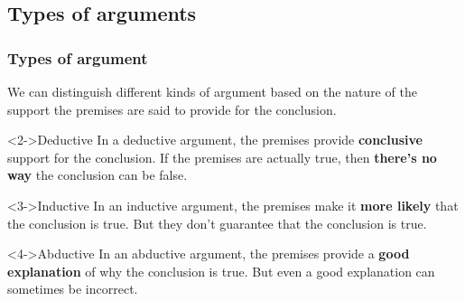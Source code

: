 \documentclass[10pt,letterpaper,xcolor=dvipsnames,handout]{beamer}
\begin{document}
\subsection{Types of arguments}

\begin{frame}
\frametitle{Types of argument}

We can distinguish different kinds of argument based on the nature of the support the premises are said to provide for the conclusion.

\begin{block}<2->{Deductive}
  In a deductive argument, the premises provide \textbf{conclusive} support for the conclusion.  If the premises are actually true, then \textbf{there's no way} the conclusion can be false.
\end{block}

\begin{block}<3->{Inductive}
  In an inductive argument, the premises make it \textbf{more likely} that the conclusion is true.  But they don't guarantee that the conclusion is true.
\end{block}

\begin{block}<4->{Abductive}
  In an abductive argument, the premises provide a \textbf{good explanation} of why the conclusion is true. But even a good explanation can sometimes be incorrect.
\end{block}

\end{frame}
\end{document}
